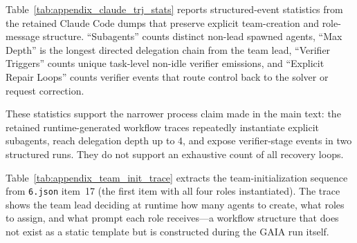 Table~\ref{tab:appendix_claude_trj_stats} reports structured-event statistics from the retained Claude Code dumps that preserve explicit team-creation and role-message structure. ``Subagents'' counts distinct non-lead spawned agents, ``Max Depth'' is the longest directed delegation chain from the team lead, ``Verifier Triggers'' counts unique task-level non-idle verifier emissions, and ``Explicit Repair Loops'' counts verifier events that route control back to the solver or request correction.

\begin{table}[t]
    \centering
    \caption{Structured-event statistics from retained Claude Code GAIA trajectory dumps with explicit team-creation and role-message structure.}
    \label{tab:appendix_claude_trj_stats}
    \small
    \setlength{\tabcolsep}{6pt}
    \renewcommand{\arraystretch}{1.15}
\end{table}

These statistics support the narrower process claim made in the main text: the retained runtime-generated workflow traces repeatedly instantiate explicit subagents, reach delegation depth up to 4, and expose verifier-stage events in two structured runs. They do not support an exhaustive count of all recovery loops.

Table~\ref{tab:appendix_team_init_trace} extracts the team-initialization sequence from \texttt{6.json} item~17 (the first item with all four roles instantiated). The trace shows the team lead deciding at runtime how many agents to create, what roles to assign, and what prompt each role receives---a workflow structure that does not exist as a static template but is constructed during the GAIA run itself.

